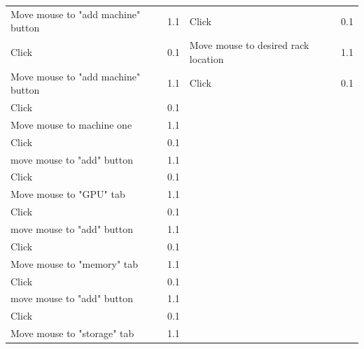 \documentclass[11pt]{article}
\begin{document}
\begin{table}[h!]
{\begin{tabular}{lrlr}
					Move mouse to "add machine" button       & 1.1       & Click                                           & 0.1 \\
					Click                                    & 0.1       & Move mouse to desired rack location             & 1.1 \\
					Move mouse to "add machine" button       & 1.1       & Click                                           & 0.1 \\
					Click                                    & 0.1       &                                                 &     \\
					Move mouse to machine one                & 1.1       &                                                 &     \\
					Click                                    & 0.1       &                                                 &     \\
					move mouse to "add" button               & 1.1       &                                                 &     \\
					Click                                    & 0.1       &                                                 &     \\
					Move mouse to "GPU" tab                  & 1.1       &                                                 &     \\
					Click                                    & 0.1       &                                                 &     \\
					move mouse to "add" button               & 1.1       &                                                 &     \\
					Click                                    & 0.1       &                                                 &     \\
					Move mouse to "memory" tab               & 1.1       &                                                 &     \\
					Click                                    & 0.1       &                                                 &     \\
					move mouse to "add" button               & 1.1       &                                                 &     \\
					Click                                    & 0.1       &                                                 &     \\
					Move mouse to "storage" tab              & 1.1       &                                                 &     \\

\end{tabular}}
\end{table}
\end{document}
